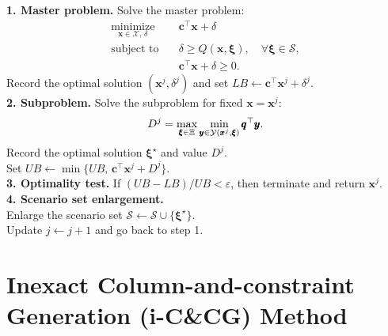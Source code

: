 \documentclass[preprint,review,11pt]{elsarticle}
\theoremstyle{definition}
\theoremstyle{remark}
\newcommand{\tp}{\top}
\newcommand{\calS}{\mathcal{S}}
\newcommand{\calX}{\mathcal{X}}
\newcommand{\calY}{\mathcal{Y}}
\newcommand{\xb}{\pmb{x}}
\newcommand{\yb}{\pmb{y}}
\newcommand{\cb}{\pmb{c}}
\newcommand{\qb}{\pmb{q}}
\newcommand{\xib}{\pmb{\xi}}
\newcommand{\blue}{\textcolor{black}}
\begin{document}
\begin{algorithm}[t] %
{}
\Initialization{Set $LB=0$, $UB=\infty$, $\varepsilon\in[0,1]$, $\calS=\emptyset$, $j=1$.} 
\textbf{1. Master problem.} Solve the master problem:
%
\begin{subequations}
\begin{align}
\underset{\xb\in\calX,\,\delta}{\text{minimize}} \quad
&  \cb^\tp\xb + \delta \\
\text{subject to} \quad
&  \delta \geq  Q(\xb,\xib),\quad \forall \xib\in\calS, \\
&  \cb^\tp\xb + \delta \geq 0.
\end{align}  \label{prob:Exact_C&CG_Master}%
\end{subequations}
%
\hspace{1.6mm}Record the optimal solution $(\xb^j,\delta^j)$ and set $LB \leftarrow  \cb^\tp\xb^j + \delta^j$. \\
%
\textbf{2. Subproblem.} Solve the subproblem for fixed $\xb=\xb^j$:
%
\begin{equation}   \label{prob:Exact_C&CG_Subproblem}
    \blue{D^j} = \max_{\xib\in\Xi} \min_{\yb\in\calY(\xb^j,\xib)} \qb^\tp \yb .
\end{equation}
%
\hspace{1.6mm}Record the optimal solution $\xib^\star$ and value $D^j$.\\
\hspace{2.5mm} Set $UB \leftarrow  \min\big\{UB,\,\cb^\tp\xb^j +D^j\big\}$.\\
\textbf{3. Optimality test.} If $(UB-LB)/UB<\varepsilon$, then terminate and return $\xb^j$. \\
\textbf{4. Scenario set enlargement.}\\
\quad Enlarge the scenario set $\calS \leftarrow \calS\cup\{\xib^\star\}$. \\ \quad Update $j \leftarrow j+1$ and go back to step 1.
\BlankLine
\caption{Column-and-constraint generation (C\&CG) method} \label{algo:exact_C&CG}
\end{algorithm}\DecMargin{1em}




\section{Inexact Column-and-constraint Generation (i-C\&CG) Method} \label{sec:inexact_C&CG}
\end{document}
